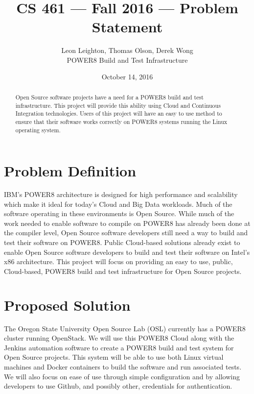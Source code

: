 \documentclass[10pt,letterpaper,onecolumn,draftclsnofoot]{IEEEtran}
\begin{document}
\begin{titlepage}
  \title{CS 461 --- Fall 2016 --- Problem Statement}
  \author{Leon Leighton, Thomas Olson, Derek Wong\\POWER8 Build and Test Infrastructure}
  \date{October 14, 2016}
  \maketitle
  \vspace{4cm}
  \begin{abstract}
  \noindent Open Source software projects have a need for a POWER8 build and test infrastructure.
  This project will provide this ability using Cloud and Continuous Integration technologies. 
  Users of this project will have an easy to use method to ensure that their software works correctly on POWER8 systems running the Linux operating system.
  \end{abstract}
\end{titlepage}

\section*{Problem Definition}
IBM's POWER8 architecture is designed for high performance and scalability which make it ideal for today's Cloud and Big Data workloads.
Much of the software operating in these environments is Open Source. 
While much of the work needed to enable software to compile on POWER8 has already been done at the compiler level, Open Source software developers still need a way to build and test their software on POWER8. 
Public Cloud-based solutions already exist to enable Open Source software developers to build and test their software on Intel's x86 architecture. 
This project will focus on providing an easy to use, public, Cloud-based, POWER8 build and test infrastructure for Open Source projects. 


\section*{Proposed Solution}
The Oregon State University Open Source Lab (OSL) currently has a POWER8 cluster running OpenStack.
We will use this POWER8 Cloud along with the Jenkins automation software to create a POWER8 build and test system for Open Source projects. 
This system will be able to use both Linux virtual machines and Docker containers to build the software and run associated tests. 
We will also focus on ease of use through simple configuration and by allowing developers to use Github, and possibly other, credentials for authentication.
\end{document}
